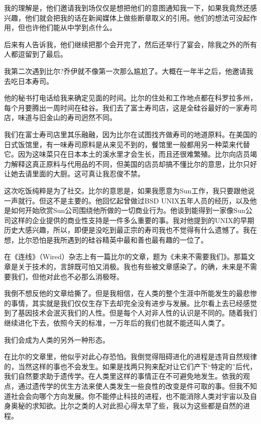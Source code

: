 我的理解是，他们邀请我到场仅仅是想把他们的意图通知我一下，如果我竟然还感兴趣，他们就会把我的话在新闻媒体上做些断章取义的引用。他们的想法可没起作用，但也许他们能从中学到点什么。

后来有人告诉我，他们继续把那个会开完了，然后还举行了宴会，除我之外的所有人都逗留到了最后。

我第二次遇到比尔?乔伊就不像第一次那么尴尬了。大概在一年半之后，他邀请我去吃日本寿司。

他的秘书打电话给我来确定见面的时间。比尔的住处和工作地点都在科罗拉多州，每个月要腾出一周时间在硅谷。我们去了富士寿司店，这是全硅谷最好的一家寿司店，味道与旧金山的寿司迥然不同。

我们在富士寿司店里其乐融融，因为比尔在试图找齐做寿司的地道原料。在美国的日式饭馆里，有一味寿司原料是从来见不到的，餐馆里一般都用另一种菜来代替它。因为这味菜只在日本本土的溪水里才会生长，而且还很难繁殖。比尔向店员竭力解释这真正原料与代用品的不同，但美国的店员却搞不懂比尔的意思，比尔只好让她去请里面的大厨。这可真让我忍俊不禁。

这次吃饭纯粹是为了社交。比尔的意思是，如果我愿意为Sun工作，我只要跟他说一声就行。但这不是主要的。他回忆起曾做过BSD UNIX五年人员的经历，以及他是如何开始欣赏Sun公司围绕他所做的一切商业行为。他谈到能得到一家像Sun公司这样的企业提供的商业性支持是一件多么重要的事。我对他提到的UNIX的早期历史大感兴趣，所以，即便是没吃到最正宗的寿司我也不觉得有什么遗憾了。我在想，比尔恐怕是我所遇到的硅谷精英中最和善也最有趣的一位了。

在《连线》（Wired）杂志上有一篇比尔的文章，题为《未来不需要我们》。那篇文章是关于技术的，言辞既可怕又消极。我也有些被文章感染了。的确，未来是不需要我们，但他对此也不必那么消极呀。

我倒不想反他的文章给撕了。但是我相信，在人类的整个生涯中所能发生的最悲惨的事情，其实就是我们仅仅生存下去却完全没有进步与发展。比尔看上去已经感觉到了基因技术会泯灭我们的人性。但是每个人对非人性的认识是不同的。随着我们继续进化下去，依照今天的标准，一万年后的我们也就不能还叫人类了。

我们会成为人类的另外一种形态。

在比尔的文章里，他似乎对此心存恐怕。我倒觉得阻碍进化的进程是违背自然规律的，当然这样的事也不会发生。如果是找两只狗来配对让它们产下“特定的”后代，我们自然要求助于遗传学。在人类里这样的事情正在不可避免地发生。依我的观点，通过遗传学的优生方法来使人类发生一些良性的改变是件可取的事。但我不知道社会会向哪个方向发展。你不能停止科技的进程，也不能消除人类对宇宙以及自身奥秘的求知欲。比尔之类的人对此担心得太早了些，我以为这些都是自然的进程。

